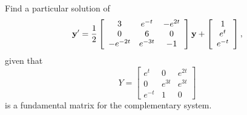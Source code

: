 \begin{example}
  \label{example:10.7.5} \rm Find a particular solution of
  \begin{equation}
    \label{eq:10.7.10}{\bf y}'=\frac{1}{2}\left[
    \begin{array}{ccc}
      3        & e^{-t}  & -e^{2t} \\
      0        & 6       & 0       \\
      -e^{-2t} & e^{-3t} & -1
    \end{array}\right]{\bf y}+\left[
    \begin{array}{c}
      1      \\
      e^{t}  \\
      e^{-t}
    \end{array}\right],
  \end{equation}
  given that
  \[
    Y=\left[
    \begin{array}{ccc}
      e^{t}  & 0      & e^{2t} \\
      0      & e^{3t} & e^{3t} \\
      e^{-t} & 1      & 0
    \end{array}\right]
  \]
  is a fundamental matrix for the complementary system.
\end{example}

